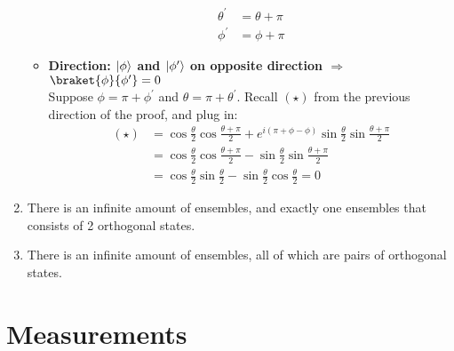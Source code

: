 \documentclass[a4paper,10pt]{hw}
\DeclarePairedDelimiter\ket{\lvert}{\rangle}
\begin{document}
\begin{enumerate}
\begin{itemize}
	\begin{align*}
	\theta^\prime & =  \theta + \pi \\
	\phi^\prime & =  \phi + \pi
	\end{align*}
	
	\item \textbf{Direction: $\ket{\phi}$ and $\ket{\phi^\prime}$ on opposite direction $\Rightarrow$ $\braket{\phi}{\phi^\prime} = 0$} \\
	Suppose $\phi = \pi + \phi^\prime$ and $\theta = \pi + \theta^\prime$. Recall $(\star)$ from the previous direction of the proof, and plug in:
	\begin{align*}
	(\star) & = \cos{\frac{\theta}{2}} \cos{\frac{\theta + \pi}{2}} + e^{i(\pi + \phi - \phi)}\sin{\frac{\theta}{2}} \sin{\frac{\theta + \pi}{2}} \\
	& = \cos{\frac{\theta}{2}} \cos{\frac{\theta + \pi}{2}} - \sin{\frac{\theta}{2}} \sin{\frac{\theta + \pi}{2}} \\
	& = \cos{\frac{\theta}{2}} \sin{\frac{\theta}{2}} - \sin{\frac{\theta}{2}} \cos{\frac{\theta}{2}} = 0
	\end{align*}
\end{itemize}

\item
There is an infinite amount of ensembles, and exactly one ensembles that consists of 2 orthogonal states.

\item
There is an infinite amount of ensembles, all of which are pairs of orthogonal states.

\end{enumerate}

\section{Measurements}
\end{document}
